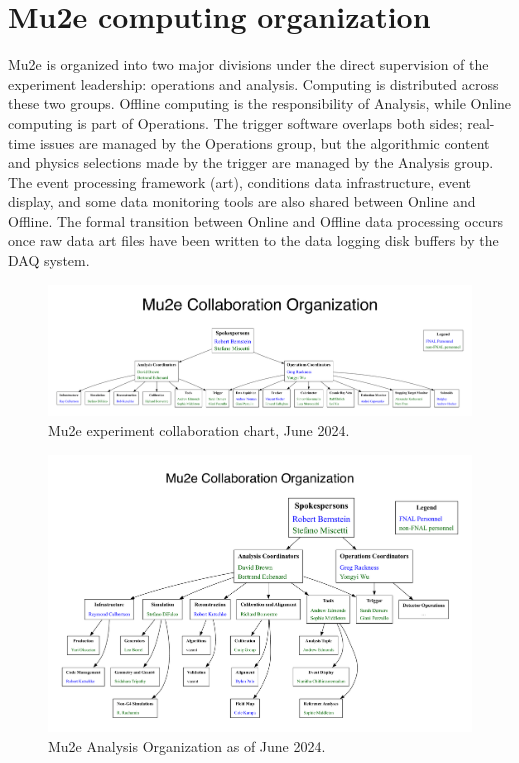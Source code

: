 \section{Mu2e computing organization}
\label{sec:mu2eorg}

Mu2e is organized into two major divisions under the direct supervision of the experiment leadership: operations and analysis. Computing is distributed across these two groups. Offline computing is the responsibility of Analysis, while Online computing is part of Operations. The trigger software overlaps both sides; real-time issues are managed by the Operations group, but the algorithmic content and physics selections made by the trigger are managed by the Analysis group. The event processing framework (art), conditions data infrastructure, event display, and some data monitoring tools are also shared between Online and Offline. The formal transition between Online and Offline data processing occurs once raw data art files have been written to the data logging disk buffers by the DAQ system. 

\begin{figure}[htb]
\begin{center}
\includegraphics[width=0.95\linewidth]{figures/OrgChart_L3.pdf}
\caption{Mu2e experiment collaboration chart, June 2024.}
\label{fig:orgchartMu2e}
\end{center}
\end{figure}

\begin{figure}[htb]
\begin{center}
\includegraphics[width=0.95\linewidth]{figures/OrgChart_Analysis.pdf}
\caption{Mu2e Analysis Organization as of June 2024.}
\label{fig:orgchart}
\end{center}
\end{figure}



